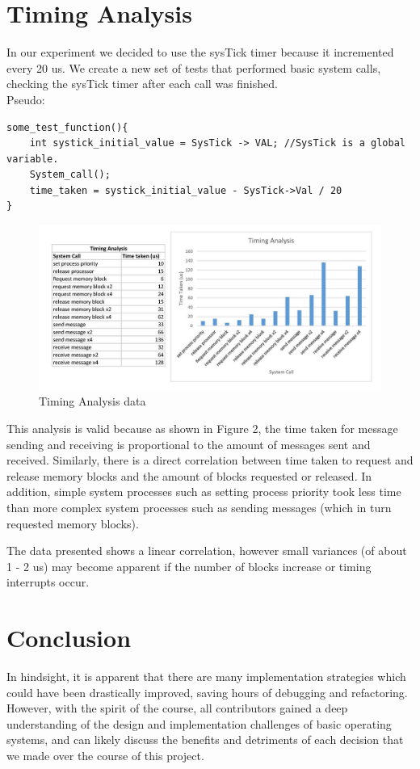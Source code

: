 \documentclass[11pt, oneside]{article}
\begin{document}
\section{Timing Analysis}
In our experiment we decided to use the sysTick timer because it incremented every 20 us. We create a new set of tests that performed basic system calls, checking the sysTick timer after each call was finished.  \\
\newline
Pseudo:
\begin{verbatim}
some_test_function(){
	int systick_initial_value = SysTick -> VAL; //SysTick is a global variable.
	System_call();
	time_taken = systick_initial_value - SysTick->Val / 20
}
\end{verbatim}

\begin{figure}[ht!]
\centering
\includegraphics[width=170mm]{TimingAnalysisGraph.jpg}
\caption{Timing Analysis data \label{overflow}}
\end{figure}

This analysis is valid because as shown in Figure 2, the time taken for message sending and receiving is proportional to the amount of messages sent and received. Similarly, there is a direct correlation between time taken to request and release memory blocks and the amount of blocks requested or released. In addition, simple system processes such as setting process priority took less time than more complex system processes such as sending messages (which in turn requested memory blocks).

The data presented shows a linear correlation, however small variances (of about 1 - 2 us) may become apparent if the number of blocks increase or timing interrupts occur. 

\section{Conclusion}
In hindsight, it is apparent that there are many implementation strategies which could have been drastically improved, saving hours of debugging and refactoring. However, with the spirit of the course, all contributors gained a deep understanding of the design and implementation challenges of basic operating systems, and can likely discuss the benefits and detriments of each decision that we made over the course of this project.
\end{document}
